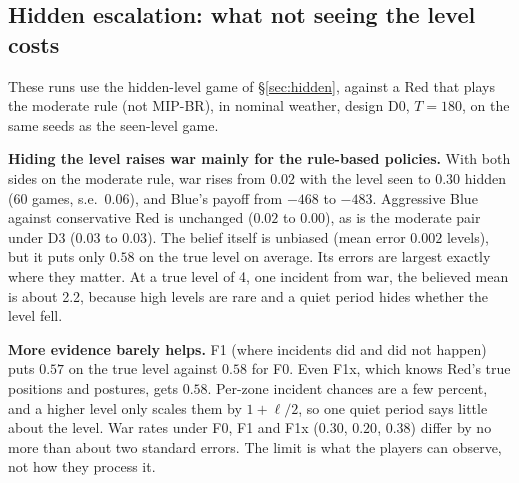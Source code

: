 \begin{addblock}
\subsection{Hidden escalation: what not seeing the level costs}\label{sec:res-hidden}
These runs use the hidden-level game of \S\ref{sec:hidden}, against a Red that plays the moderate rule (not MIP-BR),
in nominal weather, design D0, $T=180$, on the same seeds as the seen-level game.

\textbf{Hiding the level raises war mainly for the rule-based policies.} With both sides on the moderate rule, war
rises from $0.02$ with the level seen to $0.30$ hidden (60 games, s.e.\ $0.06$), and Blue's payoff from $-468$ to
$-483$. Aggressive Blue against conservative Red is unchanged ($0.02$ to $0.00$), as is the moderate pair under D3
($0.03$ to $0.03$). The belief itself is unbiased (mean error $0.002$ levels), but it puts only $0.58$ on the true level
on average. Its errors are largest exactly where they matter. At a true level of 4, one incident from war, the
believed mean is about 2.2, because high levels are rare and a quiet period hides whether the level fell.

\textbf{More evidence barely helps.} F1 (where incidents did and did not happen) puts $0.57$ on the true level against
$0.58$ for F0. Even F1x, which knows Red's true positions and postures, gets $0.58$. Per-zone incident chances are a
few percent, and a higher level only scales them by $1+\ell/2$, so one quiet period says little about the level. War
rates under F0, F1 and F1x ($0.30$, $0.20$, $0.38$) differ by no more than about two standard errors. The limit is
what the players can observe, not how they process it.


\end{addblock}
